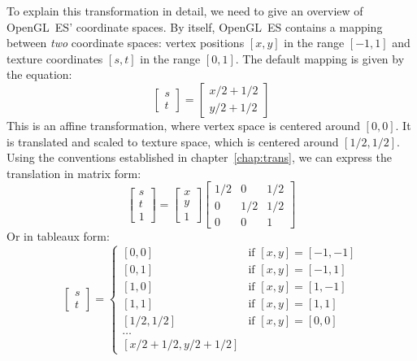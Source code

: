 \documentclass[english,12pt]{ifimaster}
\begin{document}
To explain this transformation in detail, we need to give an overview
of OpenGL~ES' coordinate spaces. By itself, OpenGL~ES contains a
mapping between \emph{two} coordinate spaces: vertex positions $[x,
y]$ in the range $[-1, 1]$ and texture coordinates $[s, t]$ in the
range $[0, 1]$. The default mapping is given by the equation:
\begin{equation}
  \label{eq:mapping}
  \left[\begin{matrix}
      s\\
      t
    \end{matrix}\right]
  =
  \left[\begin{matrix}
      x/2 + 1/2\\
      y/2 + 1/2
    \end{matrix}\right]
\end{equation}
This is an affine transformation, where vertex space is centered
around $[0, 0]$. It is translated and scaled to texture space, which
is centered around $[1/2, 1/2]$. Using the conventions established in
chapter~\ref{chap:trans}, we can express the translation in matrix
form:
\begin{equation}
  \label{eq:affinemapping}
  \left[\begin{matrix}
      s\\
      t\\
      1
    \end{matrix}\right]
  =
  \left[\begin{matrix}
      x\\
      y\\
      1
    \end{matrix}\right]
  \left[\begin{matrix}
      1/2 & 0 & 1/2\\
      0 & 1/2 & 1/2\\
      0 & 0 & 1
    \end{matrix}\right]
\end{equation}
Or in tableaux form:
\begin{equation}
  \label{eq:table}
  \left[\begin{matrix}
      s\\
      t
    \end{matrix}\right]
  =
  \begin{cases}
    [0, 0] & \text{if $[x, y] = [-1, -1]$}\\
    [0, 1] & \text{if $[x, y] = [-1, 1]$}\\
    [1, 0] & \text{if $[x, y] = [1, -1]$}\\
    [1, 1] & \text{if $[x, y] = [1, 1]$}\\
    [1/2, 1/2] & \text{if $[x, y] = [0, 0]$}\\
    \dots & \\
    [x/2 + 1/2, y/2 + 1/2] &
  \end{cases}
\end{equation}
\end{document}

